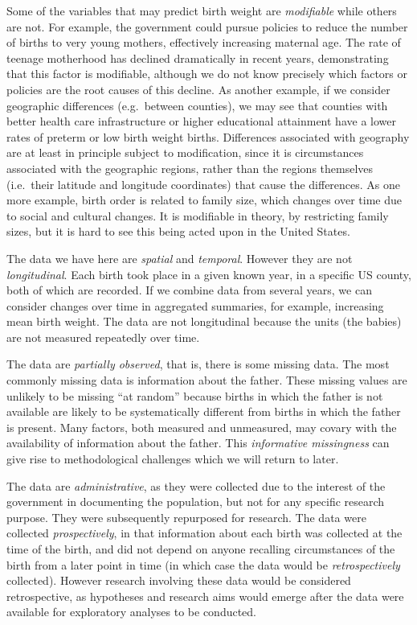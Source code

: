 Some of the variables that may predict birth weight are {\em modifiable} while others are not.  For example, the government could pursue policies to reduce the number of births to very young mothers, effectively increasing maternal age. The rate of teenage motherhood has declined dramatically in recent years, demonstrating that this factor is modifiable, although we do not know precisely which factors or policies are the root causes of this decline.  As another example, if we consider geographic differences (e.g.\ between counties), we may see that counties with better health care infrastructure or higher educational attainment have a lower rates of preterm or low birth weight births.  Differences associated with geography are at least in principle subject to modification, since it is circumstances associated with the geographic regions, rather than the regions themselves (i.e.\ their latitude and longitude coordinates) that cause the differences.  As one more example, birth order is related to family size, which changes over time due to social and cultural changes.  It is modifiable in theory, by restricting family sizes, but it is hard to see this being acted upon in the United States.

The data we have here are {\em spatial} and {\em temporal}.  However they are not {\em longitudinal}. Each birth took place in a given known year, in a specific US county, both of which are recorded.  If we combine data from several years, we can consider changes over time in aggregated summaries, for example, increasing mean birth weight.  The data are not longitudinal because the units (the babies) are not measured repeatedly over time.

The data are {\em partially observed}, that is, there is some missing data.  The most commonly missing data is information about the father.  These missing values are unlikely to be missing ``at random'' because births in which the father is not available are likely to be systematically different from births in which the father is present.  Many factors, both measured and unmeasured, may covary with the availability of information about the father.  This {\em informative missingness} can give rise to methodological challenges which we will return to later.

The data are {\em administrative}, as they were collected due to the interest of the government in documenting the population, but not for any specific research purpose.  They were subsequently repurposed for research.  The data were collected {\em prospectively}, in that information about each birth was collected at the time of the birth, and did not depend on anyone recalling circumstances of the birth from a later point in time (in which case the data would be {\em retrospectively} collected).  However research involving these data would be considered retrospective, as hypotheses and research aims would emerge after the data were available for exploratory analyses to be conducted.

